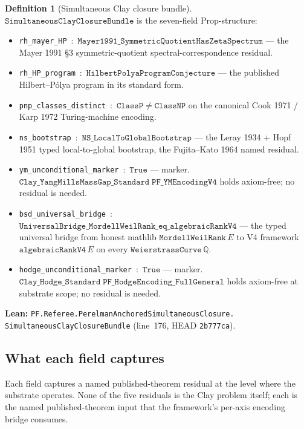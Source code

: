 \documentclass[11pt,a4paper]{article}
\theoremstyle{plain}
\theoremstyle{definition}
\newtheorem{definition}[theorem]{Definition}
\begin{document}
\begin{definition}[Simultaneous Clay closure bundle]
\label{def:bundle}
$\mathtt{SimultaneousClayClosureBundle}$ is the seven-field
Prop-structure:
\begin{itemize}[leftmargin=*,nosep]
\item \texttt{rh\_mayer\_HP} \,:\,
  $\mathtt{Mayer1991\_SymmetricQuotientHasZetaSpectrum}$ ---
  the Mayer 1991 \S3 symmetric-quotient spectral-correspondence
  residual.
\item \texttt{rh\_HP\_program} \,:\,
  $\mathtt{HilbertPolyaProgramConjecture}$ --- the published
  Hilbert--P\'olya program in its standard form.
\item \texttt{pnp\_classes\_distinct} \,:\,
  $\mathtt{ClassP} \neq \mathtt{ClassNP}$ on the canonical
  Cook 1971 / Karp 1972 Turing-machine encoding.
\item \texttt{ns\_bootstrap} \,:\,
  $\mathtt{NS\_LocalToGlobalBootstrap}$ --- the Leray 1934 +
  Hopf 1951 typed local-to-global bootstrap, the
  Fujita--Kato 1964 named residual.
\item \texttt{ym\_unconditional\_marker} \,:\, $\mathtt{True}$
  --- marker. $\mathtt{Clay\_YangMillsMassGap\_Standard\;
  PF\_YMEncodingV4}$ holds axiom-free; no residual is needed.
\item \texttt{bsd\_universal\_bridge} \,:\,
  $\mathtt{UniversalBridge\_MordellWeilRank\_eq\_algebraicRankV4}$
  --- the typed universal bridge from honest mathlib
  $\mathtt{MordellWeilRank}\, E$ to V4 framework
  $\mathtt{algebraicRankV4}\, E$ on every
  $\mathtt{WeierstrassCurve}\, \mathbb{Q}$.
\item \texttt{hodge\_unconditional\_marker} \,:\, $\mathtt{True}$
  --- marker. $\mathtt{Clay\_Hodge\_Standard\;
  PF\_HodgeEncoding\_FullGeneral}$ holds axiom-free at substrate
  scope; no residual is needed.
\end{itemize}
\textbf{Lean:}
\texttt{PF.Referee.PerelmanAnchoredSimultaneousClosure.\\
SimultaneousClayClosureBundle}
(line~176, HEAD \texttt{2b777ca}).
\end{definition}

\subsection{What each field captures}
\label{sec:bundle-fields}

Each field captures a named published-theorem residual at the
level where the substrate operates. None of the five residuals
is the Clay problem itself; each is the named published-theorem
input that the framework's per-axis encoding bridge consumes.
\end{document}
